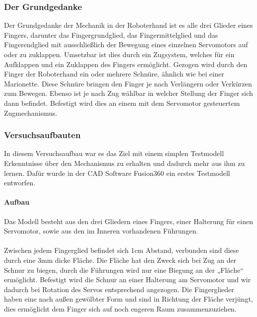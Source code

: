 \documentclass[titlepage,12pt,twoside]{article}
\begin{document}
\subsubsection{Der Grundgedanke}
Der Grundgedanke der Mechanik in der Roboterhand ist es alle drei Glieder eines Fingers,
darunter das Fingergrundglied, das Fingermittelglied und das Fingerendglied mit 
ausschließlich der Bewegung eines einzelnen Servomotors auf oder zu zuklappen. 
Umsetzbar ist dies durch ein Zugsystem, welches für ein Aufklappen und ein Zuklappen 
des Fingers ermöglicht. Gezogen wird durch den Finger der Roboterhand ein oder mehrere 
Schnüre, ähnlich wie bei einer Marionette. Diese Schnüre bringen den Finger je nach 
Verlängern oder Verkürzen zum Bewegen. Ebenso ist je nach Zug wählbar in welcher 
Stellung der Finger sich dann befindet. Befestigt wird dies an einem mit dem Servomotor 
gesteuertem Zugmechanismus. \\

\subsubsection{Versuchsaufbauten}
In diesem Versuchsaufbau war es das Ziel mit einem simplen Testmodell Erkenntnisse über 
den Mechanismus zu erhalten und dadurch mehr aus ihm zu lernen. 
Dafür wurde in der CAD Software Fusion360 ein erstes Testmodell entworfen. \\

\paragraph{Aufbau}
\hfill \break
\hfill \break
Das Modell besteht aus den drei Gliedern eines Fingers, einer Halterung für einen 
Servomotor, sowie aus den im Inneren vorhandenen Führungen. \\
\\
Zwischen jedem Fingerglied befindet sich 1cm Abstand, verbunden sind diese durch eine 
3mm dicke Fläche. Die Fläche hat den Zweck sich bei Zug an der Schnur zu biegen, durch 
die Führungen wird nur eine Biegung an der „Fläche“ ermöglicht. Befestigt wird die
Schnur an einer Halterung am Servomotor und wir dadurch bei Rotation des Servos 
entsprechend angezogen. Die Fingerglieder haben eine nach außen gewölbter Form und sind 
in Richtung der Fläche verjüngt, dies ermöglicht dem Finger sich auf noch engeren Raum 
zusammenzuziehen.
\end{document}

